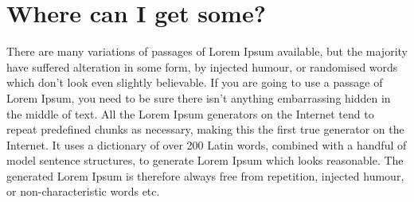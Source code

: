 \section*{Where can I get some?}

There are many variations of passages of Lorem Ipsum available, but the majority
have suffered alteration in some form, by injected humour, or randomised words
which don't look even slightly believable. If you are going to use a passage of
Lorem Ipsum, you need to be sure there isn't anything embarrassing hidden in the
middle of text. All the Lorem Ipsum generators on the Internet tend to repeat
predefined chunks as necessary, making this the first true generator on the
Internet. It uses a dictionary of over 200 Latin words, combined with a handful
of model sentence structures, to generate Lorem Ipsum which looks reasonable.
The generated Lorem Ipsum is therefore always free from repetition, injected
humour, or non-characteristic words etc.
